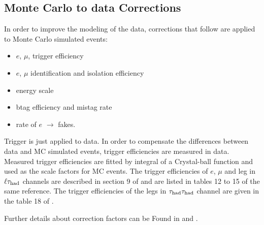 \subsection{Monte Carlo to data Corrections}
\label{sec:scaleFactors}
In order to improve the modeling of the data, corrections that follow are
 applied  to Monte Carlo simulated events:
\begin{itemize}
\item $e$, $\mu$, \Tau trigger efficiency
\item $e$, $\mu$ identification and isolation efficiency
\item \Tau energy scale
\item btag efficiency and mistag rate
\item rate of $e$ $\rightarrow$ \Tau  fakes.
\end{itemize}

Trigger is just applied to data. In order to compensate the differences between data and MC simulated events, 
trigger efficiencies are measured in data. Measured trigger efficiencies are fitted by integral of a Crystal-ball function and used as
the scale factors for MC events. 
The trigger efficiencies of $e$, $\mu$ and \Tau leg in $\ell\tau_{\rm had}$ channels are described in section 9 of \cite{CMS_AN_2013-171}  and are listed in 
tables 12 to 15 of the same reference. The trigger efficiencies of the \Tau legs in $\tau_{\rm had}\tau_{\rm had}$ channel are given in the 
table 18 of \cite{CMS_AN_2013-011}.
 
Further details about correction factors can be Found  in  \cite{CMS_AN_2013-171} and \cite{HiggsTauTautwiki}.


 

